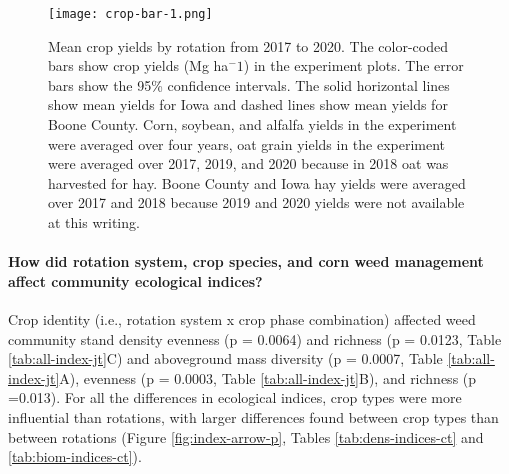 \documentclass[
]{article}
\begin{document}
\begin{figure}[H]
\centering
\texttt{[image: crop-bar-1.png]}
\caption{\label{fig:crop-bar}Mean crop yields by rotation from 2017 to 2020. The color-coded bars show crop yields (Mg ha\(^-1\)) in the experiment plots. The error bars show the 95\% confidence intervals. The solid horizontal lines show mean yields for Iowa and dashed lines show mean yields for Boone County. Corn, soybean, and alfalfa yields in the experiment were averaged over four years, oat grain yields in the experiment were averaged over 2017, 2019, and 2020 because in 2018 oat was harvested for hay. Boone County and Iowa hay yields were averaged over 2017 and 2018 because 2019 and 2020 yields were not available at this writing.}
\end{figure}

\hypertarget{how-did-rotation-system-crop-species-and-corn-weed-management-affect-community-ecological-indices}{%
\paragraph*{How did rotation system, crop species, and corn weed management affect community ecological indices?}\label{how-did-rotation-system-crop-species-and-corn-weed-management-affect-community-ecological-indices}}

Crop identity (i.e., rotation system x crop phase combination) affected weed community stand density evenness (p = 0.0064) and richness (p = 0.0123, Table \ref{tab:all-index-jt}C) and aboveground mass diversity (p = 0.0007, Table \ref{tab:all-index-jt}A), evenness (p = 0.0003, Table \ref{tab:all-index-jt}B), and richness (p =0.013). For all the differences in ecological indices, crop types were more influential than rotations, with larger differences found between crop types than between rotations (Figure \ref{fig:index-arrow-p}, Tables \ref{tab:dens-indices-ct} and \ref{tab:biom-indices-ct}).
\end{document}
